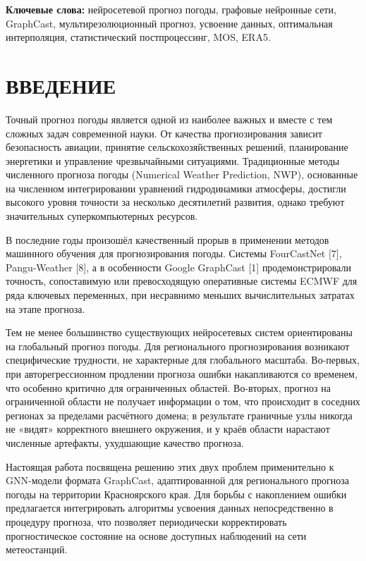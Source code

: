 \documentclass[14pt,a4paper]{extarticle}
\numberwithin{table}{section}
\numberwithin{figure}{section}
\numberwithin{equation}{section}
\begin{document}
\textbf{Ключевые слова:} нейросетевой прогноз погоды, графовые нейронные
сети, GraphCast, мультирезолюционный прогноз, усвоение данных,
оптимальная интерполяция, статистический постпроцессинг, MOS, ERA5.


\newpage

\tableofcontents

\section{ВВЕДЕНИЕ}\label{ux432ux432ux435ux434ux435ux43dux438ux435}

Точный прогноз погоды является одной из наиболее важных и вместе с тем
сложных задач современной науки. От качества прогнозирования зависит
безопасность авиации, принятие сельскохозяйственных решений,
планирование энергетики и управление чрезвычайными ситуациями.
Традиционные методы численного прогноза погоды (Numerical Weather
Prediction, NWP), основанные на численном интегрировании уравнений
гидродинамики атмосферы, достигли высокого уровня точности за несколько
десятилетий развития, однако требуют значительных суперкомпьютерных
ресурсов.

В последние годы произошёл качественный прорыв в применении методов
машинного обучения для прогнозирования погоды. Системы FourCastNet
{[}7{]}, Pangu-Weather {[}8{]}, а в особенности Google GraphCast {[}1{]}
продемонстрировали точность, сопоставимую или превосходящую оперативные
системы ECMWF для ряда ключевых переменных, при несравнимо меньших
вычислительных затратах на этапе прогноза.

Тем не менее большинство существующих нейросетевых систем ориентированы
на глобальный прогноз погоды. Для регионального прогнозирования
возникают специфические трудности, не характерные для глобального
масштаба. Во-первых, при авторегрессионном продлении прогноза ошибки
накапливаются со временем, что особенно критично для ограниченных
областей. Во-вторых, прогноз на ограниченной области не получает
информации о том, что происходит в соседних регионах за пределами
расчётного домена; в результате граничные узлы никогда не «видят»
корректного внешнего окружения, и у краёв области нарастают численные
артефакты, ухудшающие качество прогноза.

Настоящая работа посвящена решению этих двух проблем применительно к
GNN-модели формата GraphCast, адаптированной для регионального прогноза
погоды на территории Красноярского края. Для борьбы с накоплением ошибки
предлагается интегрировать алгоритмы усвоения данных непосредственно в
процедуру прогноза, что позволяет периодически корректировать
прогностическое состояние на основе доступных наблюдений на сети
метеостанций.
\end{document}
